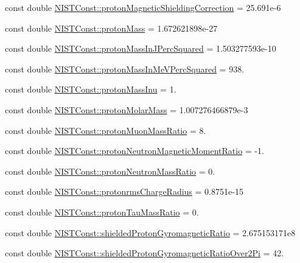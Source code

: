 \begin{DoxyCompactItemize}
\item 
const double \hyperlink{group___n_i_s_t_const-_proton_ga401cef12f93ba64cca44703bbdb516e7}{N\+I\+S\+T\+Const\+::proton\+Magnetic\+Shielding\+Correction} = 25.\+691e-\/6
\item 
const double \hyperlink{group___n_i_s_t_const-_proton_gaa6738785a6bf04323231318dd6b2ed90}{N\+I\+S\+T\+Const\+::proton\+Mass} = 1.\+672621898e-\/27
\item 
const double \hyperlink{group___n_i_s_t_const-_proton_gae46a62aa4ccd40b74db6a45a3933cf0f}{N\+I\+S\+T\+Const\+::proton\+Mass\+In\+J\+Perc\+Squared} = 1.\+503277593e-\/10
\item 
const double \hyperlink{group___n_i_s_t_const-_proton_gad2f4fab753bd216193f8c31ced93d46d}{N\+I\+S\+T\+Const\+::proton\+Mass\+In\+Me\+V\+Perc\+Squared} = 938.
\item 
const double \hyperlink{group___n_i_s_t_const-_proton_gaf2a9916164fce50112bd8bbe8b712e5a}{N\+I\+S\+T\+Const\+::proton\+Mass\+Inu} = 1.
\item 
const double \hyperlink{group___n_i_s_t_const-_proton_ga8a29760b90301104dbd9512674eccc4c}{N\+I\+S\+T\+Const\+::proton\+Molar\+Mass} = 1.\+007276466879e-\/3
\item 
const double \hyperlink{group___n_i_s_t_const-_proton_gab9c5458c70434c20a8527661c4ff0b73}{N\+I\+S\+T\+Const\+::proton\+Muon\+Mass\+Ratio} = 8.
\item 
const double \hyperlink{group___n_i_s_t_const-_proton_ga349fed5e91e8d7f8d71ba45405da64e7}{N\+I\+S\+T\+Const\+::proton\+Neutron\+Magnetic\+Moment\+Ratio} = -\/1.
\item 
const double \hyperlink{group___n_i_s_t_const-_proton_ga8b54a81cc7dec7f196f874dcc81dbab2}{N\+I\+S\+T\+Const\+::proton\+Neutron\+Mass\+Ratio} = 0.
\item 
const double \hyperlink{group___n_i_s_t_const-_proton_gadc726e50679ce96f2d6c0e84c378998e}{N\+I\+S\+T\+Const\+::protonrms\+Charge\+Radius} = 0.\+8751e-\/15
\item 
const double \hyperlink{group___n_i_s_t_const-_proton_ga6b8624fb113601433f311bb5d3423115}{N\+I\+S\+T\+Const\+::proton\+Tau\+Mass\+Ratio} = 0.
\item 
const double \hyperlink{group___n_i_s_t_const-_proton_ga2affce442da8b445cce1c580b41bbd82}{N\+I\+S\+T\+Const\+::shielded\+Proton\+Gyromagnetic\+Ratio} = 2.\+675153171e8
\item 
const double \hyperlink{group___n_i_s_t_const-_proton_ga5b2d223ede8fc141af04cef0486c2c52}{N\+I\+S\+T\+Const\+::shielded\+Proton\+Gyromagnetic\+Ratio\+Over2\+Pi} = 42.

\end{DoxyCompactItemize}
